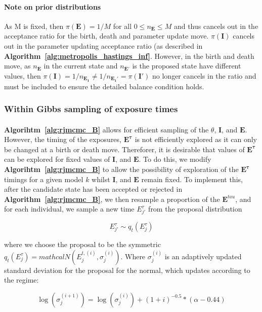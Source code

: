 \documentclass{article}
\begin{document}
\paragraph{Note on prior distributions}As M is fixed, then $\pi(\mathbf{E}) = 1/M$ for all $0 \leq n_{\mathbf{E}} \leq M$ and thus cancels out in the acceptance ratio for the birth, death and parameter update move. $\pi(\mathbf{I})$ cancels out in the parameter updating acceptance ratio (as described in \textbf{Algorithm~\ref{alg:metropolis_hastings_inf}}. However, in the birth and death move, as $n_{\mathbf{E}}$ in the current state and $n_{\mathbf{E}'}$ is the proposed state have different values, then $\pi(\mathbf{I}) = 1/n_\mathbf{E_1} \neq  1/n_\mathbf{E_1'} = \pi(\mathbf{I}')$ no longer cancels in the ratio and must be included to ensure the detailed balance condition holds. 

\subsubsection{Within Gibbs sampling of exposure times}

\paragraph{}\textbf{Algorihtm~\ref{alg:rjmcmc_B}} allows for efficient sampling of the $\theta$, $\mathbf{I}$, and $\mathbf{E}$. However, the timing of the exposures, $\mathbf{E^\tau}$ is not efficiently explored as it can only be changed at a birth or death move. Thereforer, it is desirable that values of $\mathbf{E^\tau}$ can be explored for fixed values of $\mathbf{I}$, and $\mathbf{E}$. To do this, we modify \textbf{Algorihtm~\ref{alg:rjmcmc_B}} to allow the possibility of exploration of the $\mathbf{E^\tau}$ timings for a given model $k$ whilst $\mathbf{I}$, and $\mathbf{E}$ remain fixed. To implement this, after the candidate state has been accepted or rejected in \textbf{Algorithm~\ref{alg:rjmcmc_B}}, we then resample a proportion of the $\mathbf{E}^{tau}$, and for each individual, we sample a new time $E_{j'}^\tau$ from the proposal distribution

$$E_{j'}^{\tau} \sim q_t(E_{j}^{\tau}) $$

where we choose the proposal to be the symmetric $q_t(E_{j}^{\tau}) = mathcal{N}(E_j^{t, (i)}, \sigma^{(i)}_j)$.  Where $\sigma^{(i)}_j$ is an adaptively updated standard deviation for the proposal for the normal, which updates according to the regime:

$$\log\left(\sigma^{(i + 1)}_j\right) = \log\left(\sigma^{(i)}_j\right) +  (1 + i)^{-0.5}*(\alpha - 0.44) $$
\end{document}
